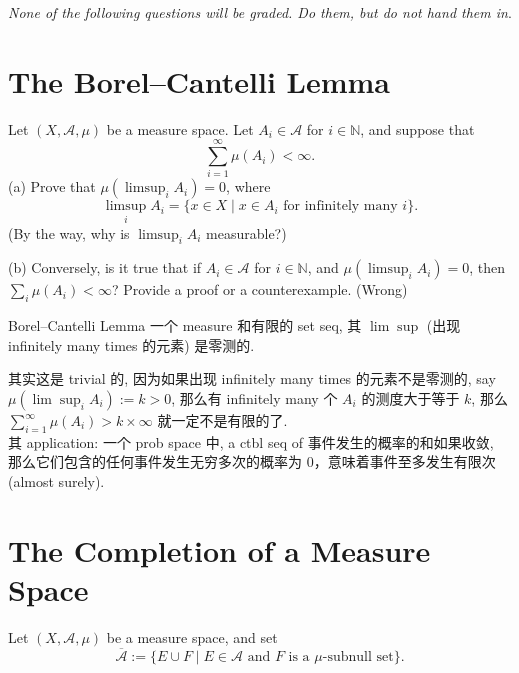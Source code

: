 \documentclass[lang=cn,11pt]{elegantbook}
\begin{document}
\begin{center}
\textit{None of the following questions will be graded. Do them, but do not hand them in}.
\end{center}

\section{The Borel--Cantelli Lemma}
Let \((X, \mathcal{A}, \mu)\) be a measure space. Let \(A_i \in \mathcal{A}\) for \(i \in \mathbb{N}\), and suppose that
\[
\sum_{i=1}^\infty \mu(A_i) < \infty.
\]
(a) Prove that \(\mu(\limsup_i A_i) = 0\), where
\[
\limsup_i A_i = \{x \in X \mid x \in A_i \text{ for infinitely many } i\}.
\]
(By the way, why is \(\limsup_i A_i\) measurable?)

(b) Conversely, is it true that if \(A_i \in \mathcal{A}\) for \(i \in \mathbb{N}\), and \(\mu(\limsup_i A_i) = 0\), then \(\sum_i \mu(A_i) < \infty\)? Provide a proof or a counterexample.
(Wrong)
\begin{remark}
\begin{theorem}{Borel--Cantelli Lemma}
    一个 measure 和有限的 set seq, 其 $\lim \sup$ (出现 infinitely many times 的元素) 是零测的.
\end{theorem}
其实这是 trivial 的, 因为如果出现 infinitely many times 的元素不是零测的, say $\mu(\lim\sup_i A_i) := k>0$, 那么有 infinitely many 个 $A_i$ 的测度大于等于 $k$, 那么 \(\sum_{i=1}^\infty \mu(A_i) > k \times \infty\) 就一定不是有限的了.\\
其 application: 一个 prob space 中, a ctbl seq of 事件发生的概率的和如果收敛, 那么它们包含的任何事件发生无穷多次的概率为 0，意味着事件至多发生有限次 (almost surely).
\end{remark}


\section{The Completion of a Measure Space}
Let \((X, \mathcal{A}, \mu)\) be a measure space, and set
\[
\overline{\mathcal{A}} := \{E \cup F \mid E \in \mathcal{A} \text{ and } F \text{ is a } \mu\text{-subnull set}\}.
\]
\end{document}
